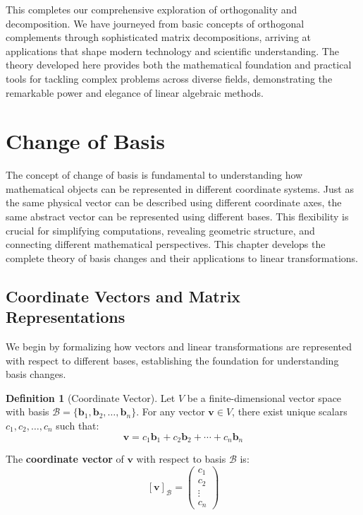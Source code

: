 \documentclass[12pt]{article}
\numberwithin{equation}{section}
\newcommand{\vect}[1]{\boldsymbol{#1}}   %
\theoremstyle{plain}
\theoremstyle{definition}
\newtheorem{definition}[theorem]{Definition}
\theoremstyle{remark}
\begin{document}
This completes our comprehensive exploration of orthogonality and decomposition. We have journeyed from basic concepts of orthogonal complements through sophisticated matrix decompositions, arriving at applications that shape modern technology and scientific understanding. The theory developed here provides both the mathematical foundation and practical tools for tackling complex problems across diverse fields, demonstrating the remarkable power and elegance of linear algebraic methods.

\newpage
\section{Change of Basis}

The concept of change of basis is fundamental to understanding how mathematical objects can be represented in different coordinate systems. Just as the same physical vector can be described using different coordinate axes, the same abstract vector can be represented using different bases. This flexibility is crucial for simplifying computations, revealing geometric structure, and connecting different mathematical perspectives. This chapter develops the complete theory of basis changes and their applications to linear transformations.

\subsection{Coordinate Vectors and Matrix Representations}

We begin by formalizing how vectors and linear transformations are represented with respect to different bases, establishing the foundation for understanding basis changes.

\begin{definition}[Coordinate Vector]
Let $V$ be a finite-dimensional vector space with basis $\mathcal{B} = \{\vect{b}_1, \vect{b}_2, \ldots, \vect{b}_n\}$. For any vector $\vect{v} \in V$, there exist unique scalars $c_1, c_2, \ldots, c_n$ such that:
$$\vect{v} = c_1\vect{b}_1 + c_2\vect{b}_2 + \cdots + c_n\vect{b}_n$$

The \textbf{coordinate vector} of $\vect{v}$ with respect to basis $\mathcal{B}$ is:
$$[\vect{v}]_{\mathcal{B}} = \begin{pmatrix} c_1 \\ c_2 \\ \vdots \\ c_n \end{pmatrix}$$
\end{definition}
\end{document}
